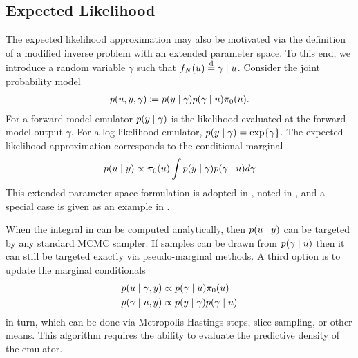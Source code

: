 \documentclass[12pt]{article}
\begin{document}
\subsection{Expected Likelihood}
The expected likelihood approximation may also be motivated via the definition of a modified 
inverse problem with an extended parameter space. To this end, we introduce a random variable
$\gamma$ such that $\funcEm[\Ndesign](\Par) \overset{\mathrm{d}}{=} \gamma \given \Par$.
Consider the joint probability model 
\begin{align}
p(\Par, \obs, \gamma) \Def 
p(\obs \given \gamma) p(\gamma \given \Par) \priorDens(\Par). \label{eq:EL-prob-model}
\end{align}
For a forward model emulator $p(\obs \given \gamma)$ is the likelihood evaluated at
the forward model output $\gamma$. For a log-likelihood emulator, 
$p(\obs \given \gamma) = \Exp{\gamma}$. The expected likelihood approximation 
corresponds to the conditional marginal 
\begin{align}
p(\Par \given \obs) \propto \priorDens(\Par) \int p(\obs \given \gamma) p(\gamma \given \Par) d\gamma
\label{eq:EL-marginal}
\end{align}
This extended parameter space formulation is adopted in \citet{BilionisBayesSurrogates}, noted in
\citet{SinsbeckNowak}, and a special case is given as an example in \citet{StuartTeck2}.

When the integral in  can be computed analytically, then $p(\Par \given \obs)$ can 
be targeted by any standard MCMC sampler. If samples can be drawn from $p(\gamma \given \Par)$ then
it can still be targeted exactly via pseudo-marginal methods. A third option is to update the marginal conditionals
\begin{align}
p(\Par \given \gamma, \obs) &\propto p(\gamma \given \Par) \priorDens(\Par) \label{eq:EL-conditionals} \\
p(\gamma \given \Par, \obs) &\propto p(\obs \given \gamma) p(\gamma \given \Par)
\end{align}
in turn, which can be done via Metropolis-Hastings steps, slice sampling, or other means. This algorithm
requires the ability to evaluate the predictive density of the emulator.
\end{document}
